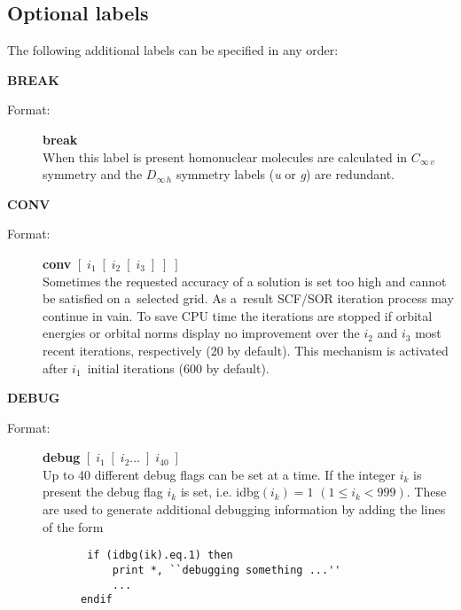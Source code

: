 \documentclass[12pt,a4paper]{article}
\newcommand{\ft}[1]{\texttt{#1}}
\begin{document}
\subsection{Optional labels}

The following additional labels can be specified in any order:
\begin{description}


\item \textbf{BREAK}
\begin{description}
\item[Format:] \textbf{break} \\ When this label is present homonuclear molecules are
  calculated in $C_{\infty\,v}$ symmetry and the $D_{\infty\,h}$ symmetry labels ({\it u}
  or {\it g}) are redundant.

\end{description}


\item \textbf{CONV}
\begin{description}
\item[Format:] \textbf{conv} $[\;i_1\;[\;i_2\;[\;i_3\;]\;]\;]$\\ Sometimes the requested
  accuracy of a solution is set too high and cannot be satisfied on a~selected grid. As
  a~result SCF/SOR iteration process may continue in vain. To save CPU time the iterations
  are stopped if orbital energies or orbital norms display no improvement over the $i_2$
  and $i_3$ most recent iterations, respectively (20 by default). This mechanism is
  activated after $i_1$~initial iterations (600 by default).
\end{description}

\item \textbf{DEBUG}
\begin{description}
\item[Format:] \textbf{debug} $[\; i_1 \; [\;i_2 \ldots \;] \;i_{40}\;]$ \\
  Up to 40 different debug flags can be set at a time.
  If the integer $i_k$ is present the debug flag $i_k$ is set, i.e. idbg$(i_k)=1$ $(1 \leq
  i_k<999)$. These are used to generate additional debugging information by adding the
  lines of the form
  \begin{verbatim}
       if (idbg(ik).eq.1) then
           print *, ``debugging something ...''
           ...
      endif
    \end{verbatim}
\end{description}


\end{description}
\end{document}

